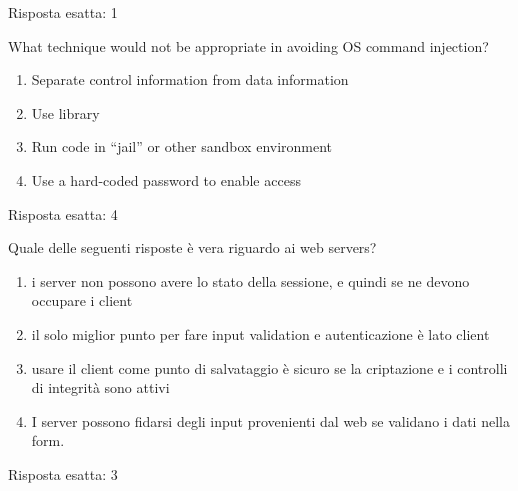 \begin{Answer} [
  ref={esControlli2},
  number={2}
  ]

  \Question Risposta esatta: 1
\end{Answer}

\begin{Exercise} [
  title={Quiz},
  label={esControlli3}
  ]

  \Question What technique would not be appropriate in avoiding OS
  command injection?
\begin{enumerate}
\item Separate control information from data information
\item Use library 
\item Run code in ``jail'' or other sandbox environment
\item Use a hard-coded password to enable access
\end{enumerate}
 

\end{Exercise}

\begin{Answer} [
  ref={esControlli3},
  number={3}
  ]

  \Question Risposta esatta: 4
\end{Answer}


\begin{Exercise} [
  title={Quiz},
  label={esControlli4}
  ]

  \Question Quale delle seguenti risposte è vera riguardo ai web servers?
  \begin{enumerate}
   \item i server non possono avere lo stato della sessione, e quindi se ne 
devono occupare i client
   \item il solo miglior punto per fare input validation e autenticazione è 
lato client
   \item usare il client come punto di salvataggio è sicuro se la criptazione 
e i controlli di integrità sono attivi
   \item I server possono fidarsi degli input provenienti dal web se validano i 
dati nella form.
  \end{enumerate}
\end{Exercise}

\begin{Answer} [
  ref={esControlli4},
  number={4}
  ]

  \Question Risposta esatta: 3
\end{Answer}


